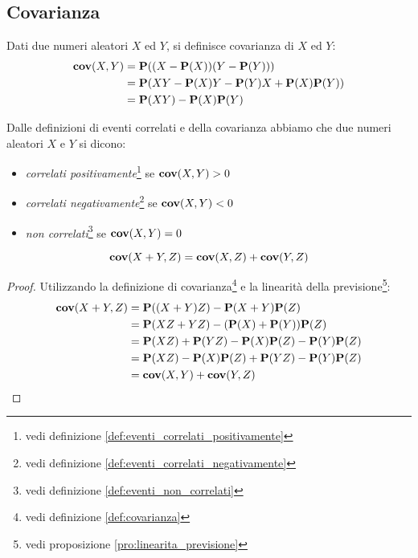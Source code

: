 \subsection{Covarianza}
\begin{definition}[Covarianza]\label{def:covarianza}
  Dati due numeri aleatori $X$ ed $Y$, si definisce covarianza di $X$ ed $Y$:
  \begin{align*}
    \mathbf{cov}(X,Y) &= \mathbf{P}((X - \mathbf{P}(X))(Y - \mathbf{P}(Y))) \\
    &= \mathbf{P}(XY - \mathbf{P}(X)Y - \mathbf{P}(Y)X + \mathbf{P}(X)\mathbf{P}(Y)) \\
    &= \mathbf{P}(XY) - \mathbf{P}(X)\mathbf{P}(Y)
  \end{align*}
\end{definition}

\begin{proposition}
  Dalle definizioni di eventi correlati e della covarianza abbiamo che due numeri aleatori $X$ e $Y$ si dicono:
  \begin{itemize}
  \item \emph{correlati positivamente}\footnote{vedi definizione \ref{def:eventi_correlati_positivamente}} se \( \mathbf{cov}(X,Y) > 0 \)
  \item \emph{correlati negativamente}\footnote{vedi definizione \ref{def:eventi_correlati_negativamente}} se \( \mathbf{cov}(X,Y) < 0 \)
  \item \emph{non correlati}\footnote{vedi definizione \ref{def:eventi_non_correlati}} se \( \mathbf{cov}(X,Y) = 0 \)
  \end{itemize}
\end{proposition}

\begin{proposition}\label{def:bilinearita_della_covarianza}
  \[ \mathbf{cov}(X+Y,Z) = \mathbf{cov}(X,Z) + \mathbf{cov}(Y,Z) \]
\end{proposition}

\begin{proof}
  Utilizzando la definizione di covarianza\footnote{vedi definizione \ref{def:covarianza}} e la linearità della previsione\footnote{vedi proposizione \ref{pro:linearita_previsione}}:
  \begin{align*}
    \mathbf{cov}(X + Y,Z) &= \mathbf{P}((X+Y)Z) - \mathbf{P}(X+Y)\mathbf{P}(Z) \\
    &= \mathbf{P}(XZ + YZ) - (\mathbf{P}(X)+\mathbf{P}(Y))\mathbf{P}(Z) \\
    &= \mathbf{P}(XZ) + \mathbf{P}(YZ) - \mathbf{P}(X)\mathbf{P}(Z) - \mathbf{P}(Y)\mathbf{P}(Z) \\
    &= \mathbf{P}(XZ) - \mathbf{P}(X)\mathbf{P}(Z) + \mathbf{P}(YZ) - \mathbf{P}(Y)\mathbf{P}(Z) \\
    &= \mathbf{cov}(X,Y) + \mathbf{cov}(Y,Z)
  \end{align*}
\end{proof}

